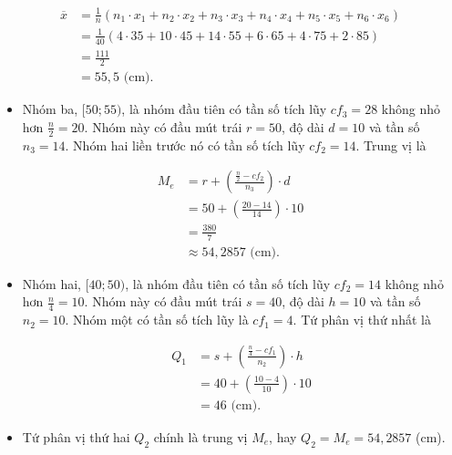 \documentclass[
  letterpaper,
  DIV=11,
  numbers=noendperiod]{scrartcl}
\providecommand{\tightlist}{%
  \setlength{\itemsep}{0pt}\setlength{\parskip}{0pt}}\usepackage{longtable,booktabs,array}
\begin{document}
\begin{align*}
    \overline{x}
        & = \frac{1}{n}(n_1\cdot x_1 + n_2\cdot x_2 + n_3\cdot x_3 + n_4\cdot x_4 + n_5\cdot x_5 + n_6\cdot x_6) \\
        & = \frac{1}{40} (4\cdot 35 + 10\cdot 45 + 14\cdot 55 + 6\cdot 65 + 4\cdot 75 + 2\cdot 85) \\
        & = \frac{111}{2} \\
        & = 55,5 \text{ (cm).}
\end{align*}

\begin{itemize}
\tightlist
\item
  Nhóm ba, \([50;55)\), là nhóm đầu tiên có tần số tích lũy \(cf_3=28\)
  không nhỏ hơn \(\frac{n}{2}=20\). Nhóm này có đầu mút trái \(r=50\),
  độ dài \(d=10\) và tần số \(n_3=14\). Nhóm hai liền trước nó có tần số
  tích lũy \(cf_2=14\). Trung vị là
\end{itemize}

\begin{align*}
M_e
    & = r + \left(\frac{\frac{n}{2}-cf_2}{n_3}\right)\cdot d \\
    & = 50 + \left(\frac{20-14}{14}\right)\cdot 10 \\
    & = \frac{380}{7} \\
    & \approx 54,2857 \text{ (cm).}
\end{align*}

\begin{itemize}
\item
  Nhóm hai, \([40;50)\), là nhóm đầu tiên có tần số tích lũy \(cf_2=14\)
  không nhỏ hơn \(\frac{n}{4}=10\). Nhóm này có đầu mút trái \(s=40\),
  độ dài \(h=10\) và tần số \(n_2=10\). Nhóm một có tần số tích lũy là
  \(cf_1=4\). Tứ phân vị thứ nhất là

  \begin{align*}
        Q_1
            & = s + \left( \frac{\frac{n}{4}-cf_1}{n_2}\right)\cdot h \\
            & = 40 + \left(\frac{10-4}{10}\right)\cdot 10 \\
            & = 46 \text{ (cm).}
    \end{align*}
\item
  Tứ phân vị thứ hai \(Q_2\) chính là trung vị \(M_e\), hay
  \(Q_2 = M_e = 54,2857\) (cm).
\end{itemize}
\end{document}
